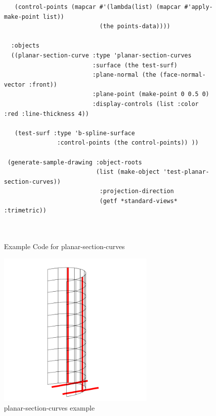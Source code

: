 \documentclass [11pt]{book}
\begin{document}
\begin{itemize}
\begin{figure}
\begin{lrbox}{\boxedverb}
\begin{minipage}{\linewidth}
{\begin{verbatim}
   (control-points (mapcar #'(lambda(list) (mapcar #'apply-make-point list)) 
                           (the points-data))))
   
  :objects
  ((planar-section-curve :type 'planar-section-curves
                         :surface (the test-surf)
                         :plane-normal (the (face-normal-vector :front))
                         :plane-point (make-point 0 0.5 0)
                         :display-controls (list :color :red :line-thickness 4))
   
   (test-surf :type 'b-spline-surface 
               :control-points (the control-points)) ))

 (generate-sample-drawing :object-roots 
                          (list (make-object 'test-planar-section-curves))
                           :projection-direction 
                           (getf *standard-views* :trimetric))

 
\end{verbatim}}
\end{minipage}
\end{lrbox}
\fbox{\usebox{\boxedverb}}

\caption{Example Code for planar-section-curves}

\label{fig:example-code-planar-section-curves}

\end{figure}

\begin{figure}
\begin{center}
\includegraphics[width=3in,height=3in]{../images/example-planar-section-curves.pdf}
\end{center}

\caption{planar-section-curves example}

\label{fig:planar-section-curves}


\end{figure}
\end{itemize}
\end{document}

